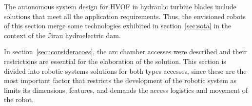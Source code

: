 The autonomous system design for HVOF in hydraulic turbine blades include
solutions that meet all the application requirements. Thus, the envisioned
robots of this section merge some technologies exhibited in
section~\ref{sec:sota} in the context of the Jirau hydroelectric dam.


In section~\ref{sec::consideracoes}, the arc chamber accesses were described
and their restrictions are essential for the elaboration of the solution.
This section is divided into robotic systems solutions for both types
accesses, since these are the most important factor that restricts the
development of the robotic system as limits its dimensions, features, and
demands the access logistics and movement of the robot.

